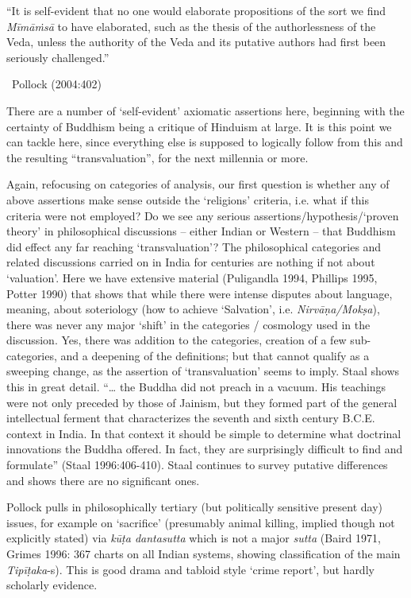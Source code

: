 \vspace{.1cm}

\begin{myquote}
“It is self-evident that no one would elaborate propositions of the sort we find \textit{Mīmāṁsā} to have elaborated, such as the thesis of the authorlessness of the Veda, unless the authority of the Veda and its putative authors had first been seriously challenged.” 

~\hfill Pollock (2004:402)
\end{myquote}

There are a number of ‘self-evident’ axiomatic assertions here, beginning with the certainty of Buddhism being a critique of Hinduism at large. It is this point we can tackle here, since everything else is supposed to logically follow from this and the resulting “transvaluation”, for the next millennia or more.

Again, refocusing on categories of analysis, our first question is whether any of above assertions make sense outside the ‘religions’ criteria, i.e. what if this criteria were not employed? Do we see any serious assertions/hypothesis/‘proven theory’ in philosophical discussions – either Indian or Western – that Buddhism did effect any far reaching ‘transvaluation’? The philosophical categories and related discussions carried on in India for centuries are nothing if not about ‘valuation’. Here we have extensive material (Puligandla 1994, Phillips 1995, Potter 1990) that shows that while there were intense disputes about language, meaning, about soteriology (how to achieve ‘Salvation’, i.e. \textit{Nirvāṇa/Mokṣa}), there was never any major ‘shift’ in the categories / cosmology used in the discussion. Yes, there was addition to the categories, creation of a few sub-categories, and a deepening of the definitions; but that cannot qualify as a sweeping change, as the assertion of ‘transvaluation’ seems to imply. Staal shows this in great detail. “… the Buddha did not preach in a vacuum. His teachings were not only preceded by those of Jainism, but they formed part of the general intellectual ferment that characterizes the seventh and sixth century B.C.E. context in India. In that context it should be simple to determine what doctrinal innovations the Buddha offered. In fact, they are surprisingly difficult to find and formulate” (Staal 1996:406-410). Staal continues to survey putative differences and shows there are no significant ones.

Pollock pulls in philosophically tertiary (but politically sensitive present day) issues, for example on ‘sacrifice’ (presumably animal killing, implied though not explicitly stated) via \textit{kūṭa dantasutta} which is not a major \textit{sutta} (Baird 1971, Grimes 1996: 367 charts on all Indian systems, showing classification of the main \textit{Tipīṭaka}-s). This is good drama and tabloid style ‘crime report’, but hardly scholarly evidence.

